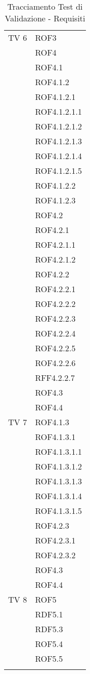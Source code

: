 \begin{center}
\begin{longtable}{|p{7cm}|p{7cm}|}
\midrule
TV 6 & ROF3\\ &  ROF4\\ &  ROF4.1\\ &  ROF4.1.2\\ &  ROF4.1.2.1\\ &  ROF4.1.2.1.1\\ &  ROF4.1.2.1.2\\ &  ROF4.1.2.1.3\\ &  ROF4.1.2.1.4\\ &  ROF4.1.2.1.5\\ &  ROF4.1.2.2\\ &  ROF4.1.2.3\\ &  ROF4.2\\ &  ROF4.2.1\\ &  ROF4.2.1.1\\ &  ROF4.2.1.2\\ &  ROF4.2.2\\ &  ROF4.2.2.1\\ &  ROF4.2.2.2\\ &  ROF4.2.2.3\\ &  ROF4.2.2.4\\ &  ROF4.2.2.5\\ &  ROF4.2.2.6\\ &  RFF4.2.2.7\\ &  ROF4.3\\ &  ROF4.4\\
\midrule
TV 7 & ROF4.1.3\\ &  ROF4.1.3.1\\ &  ROF4.1.3.1.1\\ &  ROF4.1.3.1.2\\ &  ROF4.1.3.1.3\\ &  ROF4.1.3.1.4\\ &  ROF4.1.3.1.5\\ &  ROF4.2.3\\ &  ROF4.2.3.1\\ &  ROF4.2.3.2\\ &  ROF4.3\\ &  ROF4.4\\
\midrule
TV 8 & ROF5\\ &  RDF5.1\\ &  RDF5.3\\ &  ROF5.4\\ &  ROF5.5\\

\bottomrule
\caption{Tracciamento Test di Validazione - Requisiti}
\label{tab:changelog}
\end{longtable}
\end{center}

